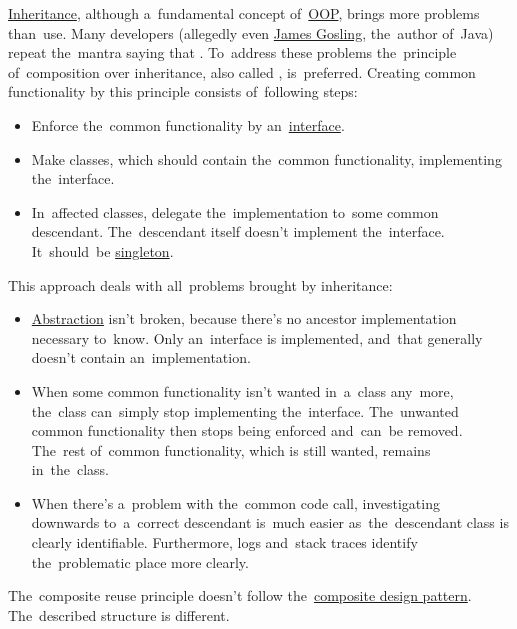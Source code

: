 \label{compositionoverinheritance}
\hyperref[inheritance]{Inheritance}, although a~fundamental concept of~\hyperref[objectorientedprogramming]{OOP}, brings more problems than~use.
Many developers (allegedly even \href{https://en.wikipedia.org/wiki/James_Gosling}{James Gosling}, the~author of~Java) repeat the~mantra saying that .
To~address these problems the~principle of~composition over inheritance, also called , is~preferred.
Creating common functionality by this principle consists of~following steps:
\begin{itemize}
    \item Enforce the~common functionality by an~\hyperref[javainterface]{interface}.
    \item Make classes, which should contain the~common functionality, implementing the~interface.
    \item In~affected classes, delegate the~implementation to~some common descendant.
          The~descendant itself doesn't implement the~interface.
          It~should~be \hyperref[singletondp]{singleton}.
\end{itemize}

\noindent This approach deals with all~problems brought by inheritance:
\begin{itemize}
    \item \hyperref[abstraction]{Abstraction} isn't broken, because there's no ancestor implementation necessary to~know.
          Only an~interface is implemented, and~that generally doesn't contain an~implementation.
    \item When some common functionality isn't wanted in~a~class any~more, the~class can~simply stop implementing the~interface.
          The~unwanted common functionality then stops being enforced and~can~be removed.
          The~rest of~common functionality, which is still wanted, remains in~the~class.
    \item When there's a~problem with the~common code call, investigating downwards to~a~correct descendant is~much easier as~the~descendant class is clearly identifiable.
          Furthermore, logs and~stack traces identify the~problematic place more clearly.
\end{itemize}

\warning The~composite reuse principle doesn't follow the~\hyperref[compositedp]{composite design pattern}.
The~described structure is different.
\newpage

